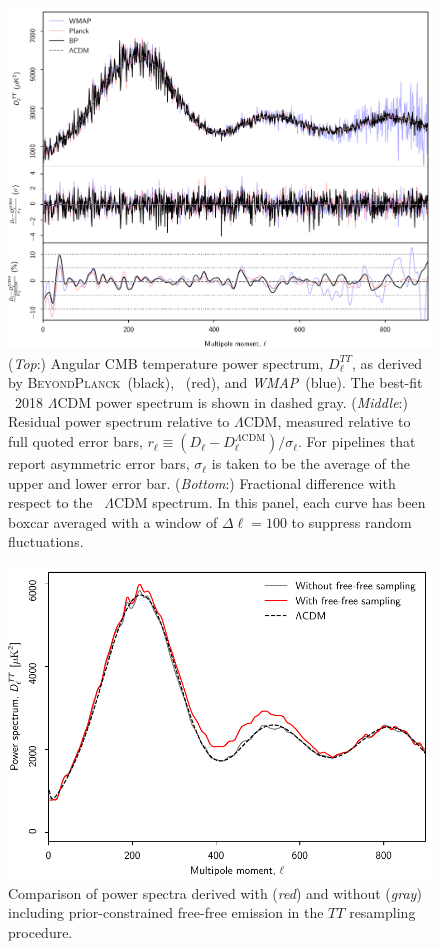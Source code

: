 \documentclass[twocolumn]{aa}
\def\WMAP{\textit{WMAP}}
\newcommand{\BP}{\textsc{BeyondPlanck}}
\begin{document}
\begin{figure}[t]
  \center
  \includegraphics[width=\linewidth]{figs/cl_TT_BP10_v2.pdf}
  \caption{(\emph{Top}:) Angular CMB temperature power spectrum,
    $D_{\ell}^{TT}$, as derived by \BP\ (black), \Planck\ (red), and
    \WMAP\ (blue). The best-fit \Planck\ 2018 $\Lambda$CDM power
    spectrum is shown in dashed gray. (\emph{Middle}:) Residual power
    spectrum relative to $\Lambda$CDM, measured relative to full
    quoted error bars, $r_{\ell} \equiv
    (D_{\ell}-D_{\ell}^{\Lambda\mathrm{CDM}})/\sigma_{\ell}$. For
    pipelines that report asymmetric error bars, $\sigma_{\ell}$ is
    taken to be the average of the upper and lower error
    bar. (\emph{Bottom}:) Fractional difference with respect to the
    \Planck\ $\Lambda$CDM spectrum. In this panel, each curve has been
    boxcar averaged with a window of $\Delta\ell=100$ to suppress
    random fluctuations. }\label{fig:cl_TT}
\end{figure}


\begin{figure}[t]
  \center
  \includegraphics[width=\linewidth]{figs/cl_TT_freefree_v1.pdf}
  \caption{Comparison of power spectra derived with (\emph{red}) and without (\emph{gray}) including prior-constrained free-free emission in the $TT$ resampling procedure.}
  \label{fig:freefree}
\end{figure}
\end{document}
